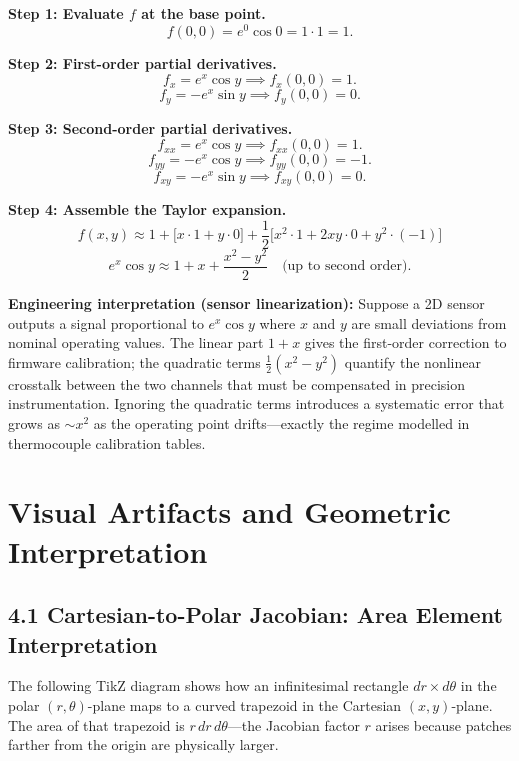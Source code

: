 \documentclass[12pt,a4paper]{article}
\begin{document}
\textbf{Step 1: Evaluate \( f \) at the base point.}
\[
  f(0,0) = e^{0}\cos 0 = 1\cdot 1 = 1.
\]

\textbf{Step 2: First-order partial derivatives.}
\[
  f_{x} = e^{x}\cos y \implies f_{x}(0,0) = 1.
\]
\[
  f_{y} = -e^{x}\sin y \implies f_{y}(0,0) = 0.
\]

\textbf{Step 3: Second-order partial derivatives.}
\[
  f_{xx} = e^{x}\cos y \implies f_{xx}(0,0) = 1.
\]
\[
  f_{yy} = -e^{x}\cos y \implies f_{yy}(0,0) = -1.
\]
\[
  f_{xy} = -e^{x}\sin y \implies f_{xy}(0,0) = 0.
\]

\textbf{Step 4: Assemble the Taylor expansion.}
\[
  f(x,y) \approx 1 + \bigl[x\cdot 1 + y\cdot 0\bigr]
               + \frac{1}{2}\bigl[x^{2}\cdot 1 + 2xy\cdot 0 + y^{2}\cdot(-1)\bigr]
\]
\[
  \boxed{e^{x}\cos y \approx 1 + x + \frac{x^{2} - y^{2}}{2} \quad \text{(up to second order)}.}
\]

\textbf{Engineering interpretation (sensor linearization):} Suppose a 2D sensor outputs a signal proportional to \( e^{x}\cos y \) where \( x \) and \( y \) are small deviations from nominal operating values. The linear part \( 1 + x \) gives the first-order correction to firmware calibration; the quadratic terms \( \tfrac{1}{2}(x^{2}-y^{2}) \) quantify the nonlinear crosstalk between the two channels that must be compensated in precision instrumentation. Ignoring the quadratic terms introduces a systematic error that grows as \( \sim x^{2} \) as the operating point drifts---exactly the regime modelled in thermocouple calibration tables.

\section{Visual Artifacts and Geometric Interpretation}

\subsection*{4.1 Cartesian-to-Polar Jacobian: Area Element Interpretation}

The following TikZ diagram shows how an infinitesimal rectangle \( dr \times d\theta \) in the polar \((r,\theta)\)-plane maps to a curved trapezoid in the Cartesian \((x,y)\)-plane. The area of that trapezoid is \( r\,dr\,d\theta \)---the Jacobian factor \( r \) arises because patches farther from the origin are physically larger.
\end{document}
